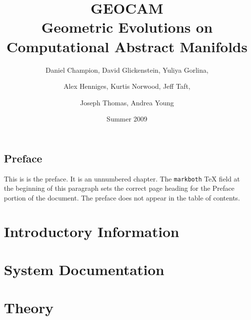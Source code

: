 \documentclass{book}
\begin{document}
\frontmatter
\title{GEOCAM\\
Geometric Evolutions on Computational Abstract Manifolds}
\author{Daniel Champion, David Glickenstein, Yuliya Gorlina, \and Alex
Henniges, Kurtis Norwood, Jeff Taft, \and Joseph Thomas, Andrea Young}
\date{Summer 2009}
\maketitle
\tableofcontents

\chapter*{Preface}

This is is the preface. It is an unnumbered
chapter. The \verb|markboth| TeX field at the beginning of this paragraph
sets the correct page heading for the Preface portion of the document. The
preface does not appear in the table of contents.

\mainmatter

\part{Introductory Information}

%

%

\part{System Documentation}

%

%

%

%

\part{Theory}
\end{document}
